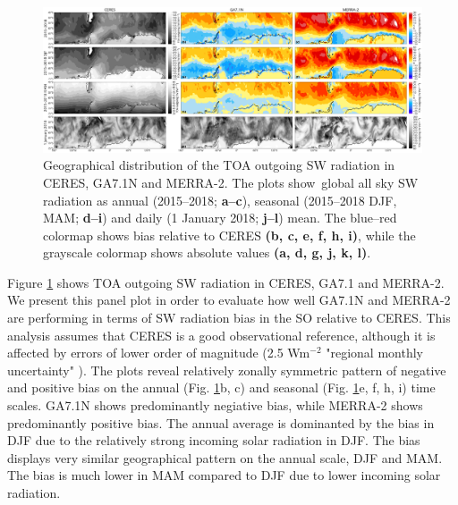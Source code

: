 \begin{figure}[t]
\centering
\includegraphics[width=\textwidth]{chapter2/fig/sw_up_toa_geo_rev1.png}
\caption[Geographical distribution of the TOA outgoing SW radiation in CERES, GA7.1N and
MERRA-2]{
Geographical distribution of the TOA outgoing SW radiation in CERES, GA7.1N and
MERRA-2. The plots show\ global all sky SW radiation as annual (2015--2018;
\textbf{a--c}), seasonal (2015--2018 DJF, MAM; \textbf{d--i}) and daily (1 January 2018; \textbf{j--l})
mean. The blue--red colormap shows bias relative to CERES \textbf{(b, c, e, f, h, i)},
while the grayscale colormap shows absolute values \textbf{(a, d, g, j, k, l)}.
}
\label{fig:2:sw_up_toa_geo}
\end{figure}

Figure \ref{fig:2:sw_up_toa_geo} shows TOA outgoing SW radiation in CERES, GA7.1
and MERRA-2. We present this panel plot in order to evaluate how well GA7.1N and
MERRA-2 are performing in terms of SW radiation bias in the SO relative to
CERES. This analysis assumes that CERES is a good observational reference,
although it is affected by errors of lower order of magnitude (2.5 Wm$^{-2}$
"regional monthly uncertainty" \citep[Sect. 4a]{loeb2018}). The plots reveal
relatively zonally symmetric pattern of negative and positive bias on the
annual (Fig. \ref{fig:2:sw_up_toa_geo}b, c) and seasonal (Fig.
\ref{fig:2:sw_up_toa_geo}e, f, h, i) time scales. GA7.1N shows predominantly
negiative bias, while MERRA-2 shows predominantly positive bias. The annual
average is dominanted by the bias in DJF due to the relatively strong incoming
solar radiation in DJF. The bias displays very similar geographical pattern on
the annual scale, DJF and MAM. The bias is much lower in MAM compared to DJF
due to lower incoming solar radiation.

